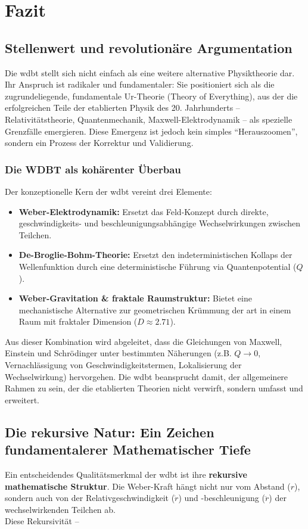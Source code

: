 \chapter{Fazit}
\section{Stellenwert und revolutionäre Argumentation}
Die \gls{wdbt} stellt sich nicht einfach als eine weitere alternative Physiktheorie dar. Ihr Anspruch ist radikaler und fundamentaler: Sie positioniert sich als die
zugrundeliegende, fundamentale Ur-Theorie (Theory of Everything), aus der die erfolgreichen Teile der etablierten Physik des 20. Jahrhunderts – Relativitätstheorie, Quantenmechanik,
Maxwell-Elektrodynamik – als spezielle Grenzfälle emergieren. Diese Emergenz ist jedoch kein simples \enquote{Herauszoomen}, sondern ein Prozess der Korrektur und Validierung.

\subsection{Die WDBT als kohärenter Überbau}
Der konzeptionelle Kern der \gls{wdbt} vereint drei Elemente:

\begin{itemize}
    \item \textbf{Weber-Elektrodynamik:} Ersetzt das Feld-Konzept durch direkte, geschwindigkeits- und beschleunigungsabhängige Wechselwirkungen zwischen Teilchen.
    \item \textbf{De-Broglie-Bohm-Theorie:} Ersetzt den indeterministischen Kollaps der Wellenfunktion durch eine deterministische Führung via Quantenpotential ($Q$).
    \item \textbf{Weber-Gravitation \& fraktale Raumstruktur:} Bietet eine mechanistische Alternative zur geometrischen Krümmung der \gls{art} in einem Raum mit fraktaler Dimension ($D \approx 2.71$).
\end{itemize}

Aus dieser Kombination wird abgeleitet, dass die Gleichungen von Maxwell, Einstein und Schrödinger unter bestimmten Näherungen (z.B. $Q \to 0$, Vernachlässigung von Geschwindigkeitstermen,
Lokalisierung der Wechselwirkung) hervorgehen. Die \gls{wdbt} beansprucht damit, der allgemeinere Rahmen zu sein, der die etablierten Theorien nicht verwirft, sondern umfasst und erweitert.

\section{Die rekursive Natur: Ein Zeichen fundamentalerer Mathematischer Tiefe}
Ein entscheidendes Qualitätsmerkmal der \gls{wdbt} ist ihre \textbf{rekursive mathematische Struktur}. Die Weber-Kraft hängt nicht nur vom Abstand ($r$), sondern auch von der Relativgeschwindigkeit ($\dot{r}$)
und -beschleunigung ($\ddot{r}$) der wechselwirkenden Teilchen ab.\\Diese Rekursivität –

